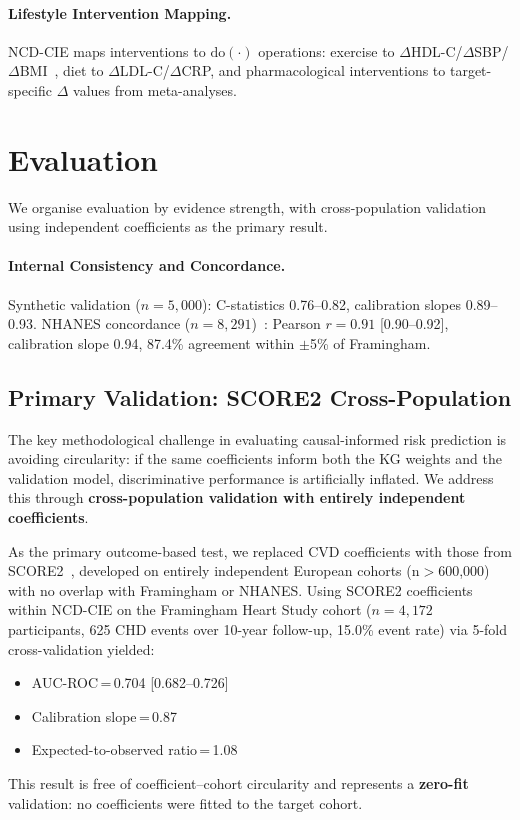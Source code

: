 \documentclass[runningheads]{llncs}
\begin{document}
\paragraph{Lifestyle Intervention Mapping.}
NCD-CIE maps interventions to $\mathrm{do}(\cdot)$ operations:
exercise to $\Delta$HDL-C/$\Delta$SBP/$\Delta$BMI~\cite{naci2019comparative},
diet to $\Delta$LDL-C/$\Delta$CRP, and pharmacological
interventions to target-specific $\Delta$ values from
meta-analyses.

\section{Evaluation}\label{sec:validation}

We organise evaluation by evidence strength, with cross-population
validation using independent coefficients as the primary result.

\paragraph{Internal Consistency and Concordance.}
Synthetic validation ($n = 5{,}000$): C-statistics 0.76--0.82,
calibration slopes 0.89--0.93.
NHANES concordance ($n = 8{,}291$)~\cite{nhanes2020}:
Pearson $r = 0.91$ [0.90--0.92], calibration slope 0.94,
87.4\% agreement within $\pm$5\% of Framingham.

\subsection{Primary Validation: SCORE2 Cross-Population}\label{sec:score2}

The key methodological challenge in evaluating causal-informed risk
prediction is avoiding circularity: if the same coefficients inform
both the KG weights and the validation model, discriminative performance
is artificially inflated.
We address this through \textbf{cross-population validation with
entirely independent coefficients}.

As the primary outcome-based test, we replaced CVD coefficients with
those from SCORE2~\cite{score22021}, developed on entirely
independent European cohorts (n$>$600,000) with no overlap with
Framingham or NHANES.
Using SCORE2 coefficients within NCD-CIE on the Framingham Heart
Study cohort ($n = 4{,}172$ participants, 625 CHD events over
10-year follow-up, 15.0\% event rate) via 5-fold cross-validation
yielded:
\begin{itemize}
\item AUC-ROC\,=\,0.704 [0.682--0.726]
\item Calibration slope\,=\,0.87
\item Expected-to-observed ratio\,=\,1.08
\end{itemize}
This result is free of coefficient--cohort circularity and represents
a \textbf{zero-fit} validation: no coefficients were fitted to the
target cohort.
\end{document}
